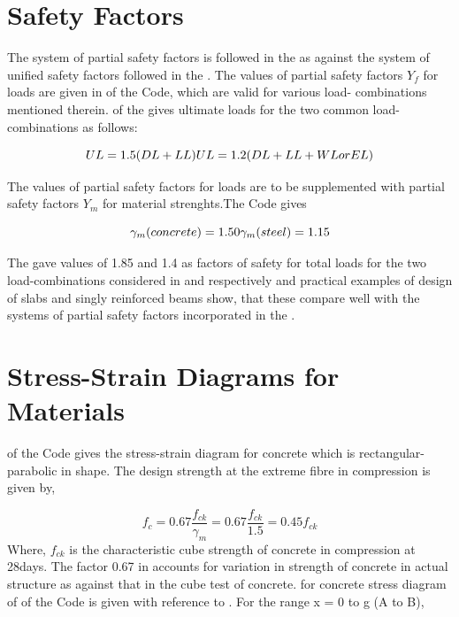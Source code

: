 \section{Safety Factors}

The system of partial safety factors is followed in the
 as against the system of uniﬁed safety factors
followed in the . The values of partial safety
factors ${Y_f}$ for loads are given in  of the Code, which
are valid for various load- combinations mentioned therein. 
of the  gives ultimate loads for the two common
load-combinations as follows:

\begin{equation}
UL = 1.5 (DL + LL)\\
UL = 1.2 (DL + LL + WL or EL)
\end{equation}

The values of partial safety factors for loads are to be supplemented
with partial safety factors $Y_m$ for material strenghts.The Code gives           

\begin{equation}
\gamma_m (concrete) = 1.50\\
\gamma_m (steel) = 1.15 
\end{equation}

The  gave values of 1.85 and 1.4 as factors of
safety for total loads for the two load-combinations considered in
 and  respectively and practical examples of design of
slabs and singly reinforced beams show, that these compare well with the
systems of partial safety factors incorporated in the
.

\section{Stress-Strain Diagrams for Materials}

 of the Code gives the stress-strain diagram for concrete which
is rectangular-parabolic in shape. The design strength at the extreme fibre in compression is given by,

\begin{equation}
f_c = 0.67\frac{f_{ck}}{\gamma_m} = 0.67\frac{f_{ck}}{1.5}=0.45 f_{ck}
\end{equation}
Where, $f_{ck}$ is the characteristic cube strength of concrete in
compression at 28days. The factor 0.67 in  accounts for
variation in strength of concrete in actual structure as against
that in the cube test of concrete. \eqn for concrete stress diagram
of  of the Code is given with reference to . For the
range x = 0 to g (A to B),

